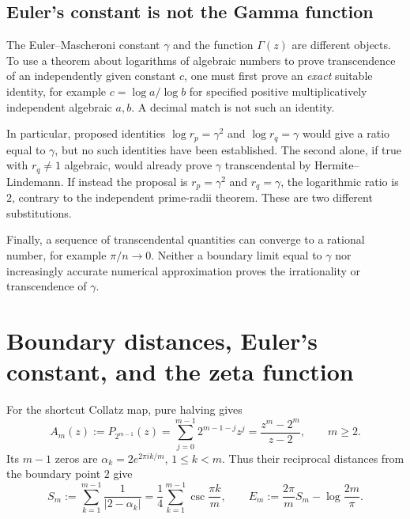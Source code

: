 \documentclass[11pt,a4paper]{article}
\theoremstyle{definition}
\theoremstyle{remark}
\numberwithin{equation}{section}
\begin{document}
\subsection{Euler's constant is not the Gamma function}
The Euler--Mascheroni constant $\gamma$ and the function $\Gamma(z)$
are different objects. To use a theorem about logarithms of algebraic
numbers to prove transcendence of an independently given constant $c$,
one must first prove an \emph{exact} suitable identity, for example
$c=\log a/\log b$ for specified positive multiplicatively independent
algebraic $a,b$. A decimal match is not such an identity.

In particular, proposed identities $\log r_p=\gamma^2$ and
$\log r_q=\gamma$ would give a ratio equal to $\gamma$, but no such
identities have been established. The second alone, if true with
$r_q\ne1$ algebraic, would already prove $\gamma$ transcendental by
Hermite--Lindemann. If instead the proposal is $r_p=\gamma^2$ and
$r_q=\gamma$, the logarithmic ratio is $2$, contrary to the independent
prime-radii theorem. These are two different substitutions.

Finally, a sequence of transcendental quantities can converge to a
rational number, for example $\pi/n\to0$. Neither a boundary limit
equal to $\gamma$ nor increasingly accurate numerical approximation
proves the irrationality or transcendence of $\gamma$.


\section{Boundary distances, Euler's constant, and the zeta function}
\label{C:sec:boundary-gamma}

For the shortcut Collatz map, pure halving gives
\[
 A_m(z):=P_{2^{m-1}}(z)=\sum_{j=0}^{m-1}2^{m-1-j}z^j
 =\frac{z^m-2^m}{z-2},\qquad m\ge2.
\]
Its $m-1$ zeros are $\alpha_k=2e^{2\pi ik/m}$, $1\le k<m$.
Thus their reciprocal distances from the boundary point $2$ give
\[
 S_m:=\sum_{k=1}^{m-1}\frac1{|2-\alpha_k|}
 =\frac14\sum_{k=1}^{m-1}\csc\frac{\pi k}{m},\qquad
 E_m:=\frac{2\pi}{m}S_m-\log\frac{2m}{\pi}.
\]
\end{document}
